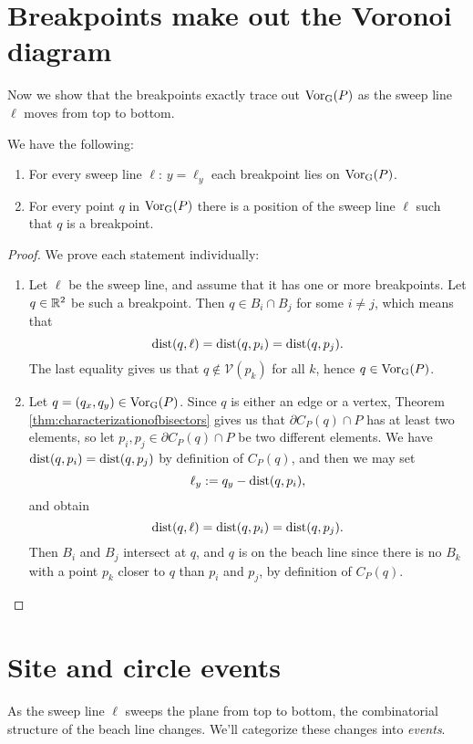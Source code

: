 \section{Breakpoints make out the Voronoi diagram}
Now we show that the breakpoints exactly trace out $\operatorname{Vor_{G}}(P)$ as the sweep line $\ell$ moves from top to bottom.
\begin{prop}
We have the following:
\begin{enumerate}[{(}i{)}]
\item For every sweep line $\ell$: $y = \ell_y$ each breakpoint lies on $\operatorname{Vor_{G}}(P)$.
\item For every point $q$ in $\operatorname{Vor_{G}}(P)$ there is a position of the sweep line $\ell$ such that $q$ is a breakpoint.
\end{enumerate}
\end{prop}
\begin{proof}
We prove each statement individually:
\begin{enumerate}[{(}i{):}]
    \item Let $\ell$ be the sweep line, and assume that it has one or more breakpoints. Let $q \in \mathbb{R}^2$ be such a breakpoint. Then $q \in B_i \cap B_j$ for some $i \ne j$, which means that
    \[
        \operatorname{dist}(q, \ell) = \operatorname{dist}(q, p_i) = \operatorname{dist}(q, p_j).
    \]
    The last equality gives us that $q \not\in \mathcal{V}(p_k)$ for all $k$, hence $q \in \operatorname{Vor_{G}}(P)$.
    \item Let $q = (q_x, q_y) \in \operatorname{Vor_{G}}(P)$. Since $q$ is either an edge or a vertex, Theorem \ref{thm:characterizationofbisectors} gives us that $\partial C_P(q) \cap P$ has at least two elements, so let $p_i, p_j \in \partial C_P(q) \cap P$ be two different elements. We have $\operatorname{dist}(q, p_i) = \operatorname{dist}(q, p_j)$ by definition of $C_P(q)$, and then we may set
    \[
        \ell_y := q_y - \operatorname{dist}(q, p_i),
    \]
    and obtain
    \[
        \operatorname{dist}(q, \ell) = \operatorname{dist}(q, p_i) = \operatorname{dist}(q, p_j).
    \]
    Then $B_i$ and $B_j$ intersect at $q$, and $q$ is on the beach line since there is no $B_k$ with a point $p_k$ closer to $q$ than $p_i$ and $p_j$, by definition of $C_P(q)$.
\end{enumerate}
\end{proof}

\section{Site and circle events}
As the sweep line $\ell$ sweeps the plane from top to bottom, the combinatorial structure of the beach line changes. We'll categorize these changes into \emph{events}.

